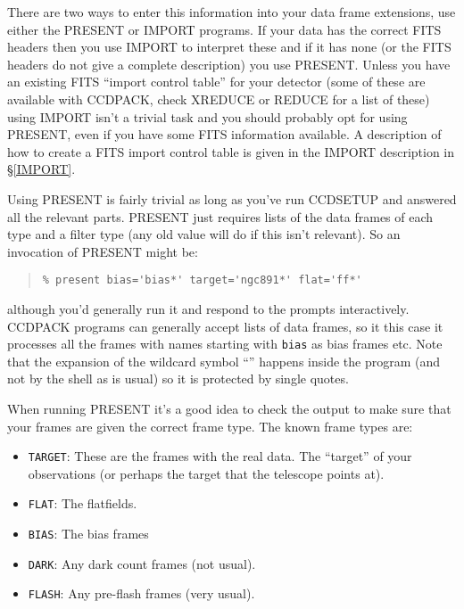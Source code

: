 \documentclass[twoside,11pt]{article}
\newcommand{\hyperref}[4]{#2\ref{#4}#3}
\newcommand{\htmlref}[2]{#1}
\renewcommand{\_}{\texttt{\symbol{95}}}
\newenvironment{myquote}{\begin{quote}\begin{small}}{\end{small}\end{quote}}
\newcommand{\text}[1]{{\small \tt #1}}
\newcommand{\routine}[1]{{\sc #1}}
\newcommand{\xroutine}[1]{\htmlref{{\sc #1}}{#1}}
\begin{document}
There are two ways to enter this information into your data frame
extensions, use either the \xroutine{PRESENT} or \xroutine{IMPORT} programs.
If your data has the correct FITS headers then you use \routine{IMPORT}
to interpret these and if it has none (or the FITS headers do not
give a complete description) you use \routine{PRESENT}. Unless you have
an existing FITS ``import control table'' for your detector (some of these
are available with CCDPACK, check \xroutine{XREDUCE} or \xroutine{REDUCE}
 for a list of these) using \routine{IMPORT}
isn't a trivial task and you should probably opt for using
\routine{PRESENT}, even if you have some FITS information available.
A description of how to create a FITS import control table is given in
the \routine{IMPORT} \hyperref{description}{description in \S}{}{IMPORT}.

Using \routine{PRESENT} is fairly trivial as long as you've
run \routine{CCDSETUP} and answered all the relevant parts.
\routine{PRESENT} just requires lists of the
data frames of each type and a filter type (any old value will do if this
isn't relevant). So an invocation of \routine{PRESENT} might be:
\begin{myquote}
\begin{verbatim}
% present bias='bias*' target='ngc891*' flat='ff*'
\end{verbatim}
\end{myquote}
although you'd generally run it and respond to the prompts
interactively. CCDPACK programs can generally accept lists of data
frames, so it this case it processes all the frames with names
starting with \text{bias} as bias frames etc. Note that the
expansion of the wildcard symbol ``\text{*}'' happens inside the program
(and not by the shell as is usual) so it is protected by single quotes.

When running \routine{PRESENT} it's a good idea to check the output to
make sure that your frames are given the correct frame type. The known frame
types are:
\begin{itemize}
\item \text{TARGET}: These are the frames with the real data. The
``target'' of your observations (or perhaps the target that the
telescope points at).
\item \text{FLAT}: The flatfields.
\item \text{BIAS}: The bias frames
\item \text{DARK}: Any dark count frames (not usual).
\item \text{FLASH}: Any pre-flash frames (very usual).
\end{itemize}
\end{document}

